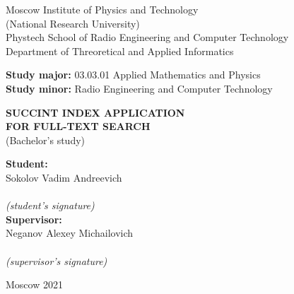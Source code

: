 \begin{center}
    Moscow Institute of Physics and Technology\\
    (National Research University)\\
    Phystech School of Radio Engineering and Computer Technology\\
    Department of Threoretical and Applied Informatics\\
\end{center}

\vspace{2mm}

\begin{flushleft}
    \textbf{Study major:} 03.03.01 Applied Mathematics and Physics\\
    \textbf{Study minor:} Radio Engineering and Computer Technology\\
\end{flushleft}

\vspace{24mm}

\begin{center}%
    \large{\textbf{SUCCINT INDEX APPLICATION\\FOR FULL-TEXT SEARCH}}\\
    (Bachelor's study)\\
\end{center}

\vspace{20mm}

\hspace{90mm}
\begin{minipage}{0.4\textwidth}
    \begin{flushleft}
        \textbf{Student:}\\Sokolov Vadim Andreevich\\
        \vspace{4mm}
        \hrulefill\\
        {\centering\scriptsize\textit{(student's signature)}\\}
        \textbf{Supervisor:}\\Neganov Alexey Michailovich\\
        \vspace{4mm}
        \hrulefill\\
        {\centering\scriptsize\textit{(supervisor's signature)}\\}
    \end{flushleft}
\end{minipage}

\vspace*{\fill}

\begin{center}
    Moscow 2021
\end{center}

\thispagestyle{empty}